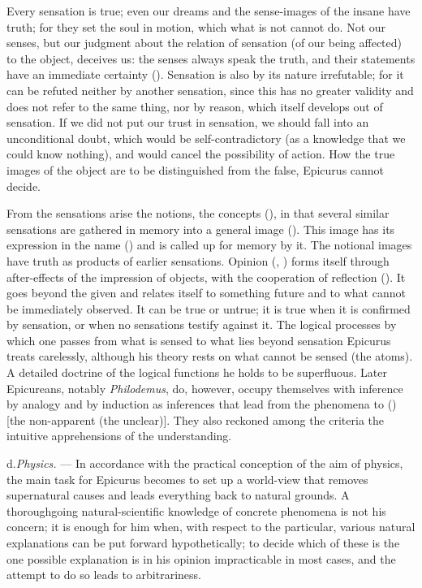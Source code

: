Every sensation is true; even our dreams and the sense-images of the
insane have truth; for they set the soul in motion, which what is not
cannot do. Not our senses, but our judgment about the relation of
sensation (of our being affected) to the object, deceives us: the senses
always speak the truth, and their statements have an immediate
certainty (). Sensation is also by its nature irrefutable;
for it can be refuted neither by another sensation, since this has no
greater validity and does not refer to the same thing, nor by reason,
which itself develops out of sensation. If we did not put our trust in
sensation, we should fall into an unconditional doubt, which would be
self-contradictory (as a knowledge that we could know nothing),
and would cancel the possibility of action. How the true images of the
object are to be distinguished from the false, Epicurus cannot decide.

From the sensations arise the notions, the concepts
(), in that several similar sensations are gathered in
memory into a general image (). This image has its
expression in the name () and is called up for memory by it.
The notional images have truth as products of earlier sensations.
Opinion (, ) forms itself through
after-effects of the impression of objects, with the cooperation of
reflection (). It goes beyond
the given and relates itself to something future and to what cannot be
immediately observed. It can be true or untrue; it is true when it is
confirmed by sensation, or when no sensations testify against it. The
logical processes by which one passes from what is sensed to what lies
beyond sensation Epicurus treats carelessly, although his theory rests
on what cannot be sensed (the atoms). A detailed doctrine of the logical
functions he holds to be superfluous. Later Epicureans, notably
\emph{Philodemus}, do, however, occupy themselves with inference by
analogy and by induction as inferences that lead from the phenomena to
 () [the non-apparent (the unclear)]. They
also reckoned among the criteria the intuitive apprehensions of the
understanding.

\divrule

d.\enspace \emph{Physics.} --- In accordance with the practical
conception of the aim of physics, the main task for Epicurus becomes to
set up a world-view that removes supernatural causes and leads
everything back to natural grounds. A thoroughgoing natural-scientific
knowledge of concrete phenomena is not his concern; it is enough for him
when, with respect to the particular, various natural explanations can
be put forward hypothetically; to decide which of these is the one
possible explanation is in his opinion impracticable in most cases, and
the attempt to do so leads to arbitrariness.

